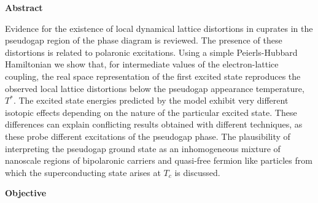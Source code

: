 
\cleardoublepage
{}
{}
\begin{center}
\textbf{\large Abstract}
\end{center}
Evidence for the existence of local dynamical lattice distortions in cuprates in the pseudogap region of the phase diagram is reviewed. 
The presence of these distortions is related to polaronic excitations. 
Using a simple Peierls-Hubbard Hamiltonian we show that, for intermediate values of the electron-lattice coupling, the real space representation of the first excited state reproduces the observed local lattice distortions below the pseudogap appearance temperature, $T^*$. 
The excited state energies predicted by the model exhibit very different isotopic effects depending on the nature of the particular excited state. 
These differences can explain conflicting results obtained with different techniques, as these probe different excitations of the pseudogap phase. 
The plausibility of interpreting the pseudogap ground state as an inhomogeneous mixture of nanoscale regions of bipolaronic carriers and quasi-free fermion like particles from which the superconducting state arises at $T_c$ is discussed.


\cleardoublepage
{}
{}
\begin{center}
\textbf{\large Objective}
\end{center}
